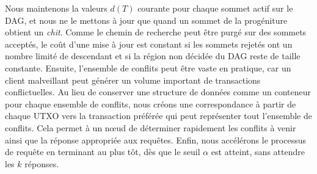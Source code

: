 \documentclass[letterpaper,twocolumn,10pt]{article}
\theoremstyle{definition}
\begin{document}
Nous maintenons la valeurs $d(T)$ courante pour chaque sommet actif sur le DAG, et nous ne le mettons à jour que quand un sommet de la progéniture obtient un \emph{chit}.
Comme le chemin de recherche peut être purgé sur des sommets acceptés, le coût d'une mise à jour est constant si les sommets rejetés ont un nombre limité de descendant et si la région non décidée du DAG reste de taille constante.
Ensuite, l'ensemble de conflits peut être vaste en pratique, car un client malveillant peut générer un volume important de transactions conflictuelles.
Au lieu de conserver une structure de données comme un conteneur pour chaque ensemble de conflits, nous créons une correspondance à partir de chaque UTXO vers la transaction préférée qui peut représenter tout l'ensemble de conflits.
Cela permet à un nœud de déterminer rapidement les conflits à venir ainsi que la réponse appropriée aux requêtes.
Enfin, nous accélérons le processus de requête en terminant au plus tôt, dès que le seuil $\alpha$ est atteint, sans attendre les $k$ réponses.


\end{document}
